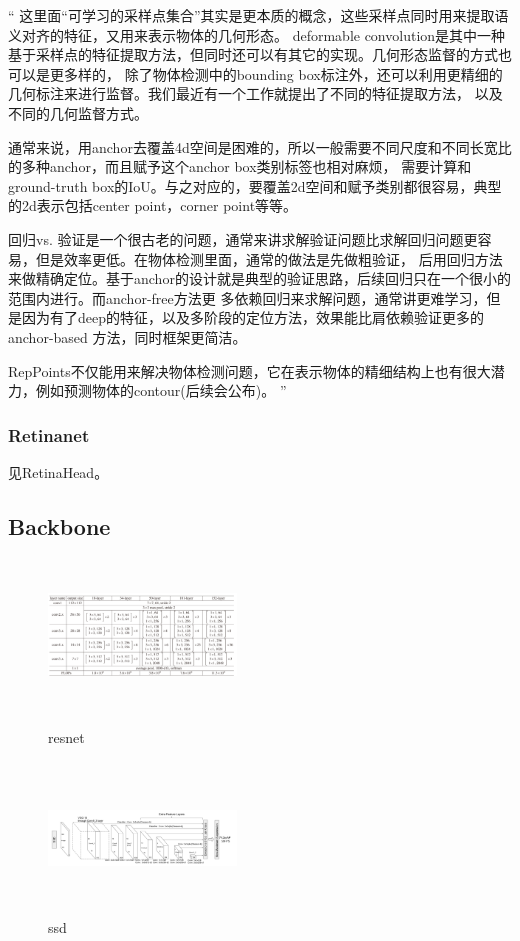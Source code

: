 \documentclass[UTF8]{ctexart}
\begin{document}
“
这里面“可学习的采样点集合”其实是更本质的概念，这些采样点同时用来提取语义对齐的特征，又用来表示物体的几何形态。
deformable convolution是其中一种基于采样点的特征提取方法，但同时还可以有其它的实现。几何形态监督的方式也可以是更多样的，
除了物体检测中的bounding box标注外，还可以利用更精细的几何标注来进行监督。我们最近有一个工作就提出了不同的特征提取方法，
以及不同的几何监督方式。

通常来说，用anchor去覆盖4d空间是困难的，所以一般需要不同尺度和不同长宽比的多种anchor，而且赋予这个anchor box类别标签也相对麻烦，
需要计算和ground-truth box的IoU。与之对应的，要覆盖2d空间和赋予类别都很容易，典型的2d表示包括center point，corner point等等。

回归vs. 验证是一个很古老的问题，通常来讲求解验证问题比求解回归问题更容易，但是效率更低。在物体检测里面，通常的做法是先做粗验证，
后用回归方法来做精确定位。基于anchor的设计就是典型的验证思路，后续回归只在一个很小的范围内进行。而anchor-free方法更
多依赖回归来求解问题，通常讲更难学习，但是因为有了deep的特征，以及多阶段的定位方法，效果能比肩依赖验证更多的anchor-based
方法，同时框架更简洁。

RepPoints不仅能用来解决物体检测问题，它在表示物体的精细结构上也有很大潜力，例如预测物体的contour(后续会公布)。
”


\subsubsection{Retinanet}
见RetinaHead。


\subsection{Backbone}
\label{backbones}

\begin{figure}[htbp]
	\centering
	\begin{minipage}[t]{0.48\textwidth}
	\centering
	\includegraphics[width=5cm, height=4cm]{./pic/resnet_struct.png}
	\caption{resnet}
	\label{picresnet}
	\end{minipage}
	\begin{minipage}[t]{0.48\textwidth}
		\centering
		\includegraphics[width=5cm,height=4cm]{./pic/ssd.png}
		\caption{ssd}
		\label{picssd}
	\end{minipage}
\end{figure}
\end{document}
